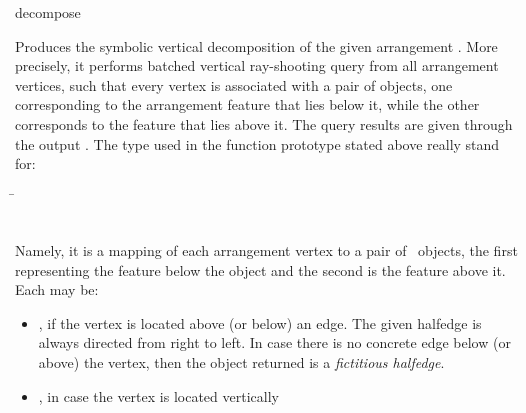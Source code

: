 
\ccRefPageBegin

\begin{ccRefFunction}{decompose}


   {Produces the symbolic vertical decomposition of the given arrangement
    . More precisely, it performs batched vertical ray-shooting
    query from all arrangement vertices, such that every vertex is associated
    with a pair of objects, one corresponding to the arrangement feature that
    lies below it, while the other corresponds to the feature that lies above
    it. The query results are given through the output . The
    type  used in the function prototype stated above really
    stand for: \\
    \begin{tabbing}
    \=\\
                      ~   \>
    \end{tabbing}
    Namely, it is a mapping of each arrangement vertex to a pair of \cgal\
    objects, the first representing the feature below the object and the second
    is the feature above it. Each \ccc{Object} may be: \\
   \begin{itemize}
   \item {}, if the vertex is located above (or below)
         an edge. The given halfedge is always directed from right to left.
         In case there is no concrete edge below (or above) the vertex, then
         the object returned is a {\em fictitious halfedge}.
   \item {}, in case the vertex is located vertically

\end{itemize}}
\end{ccRefFunction}
